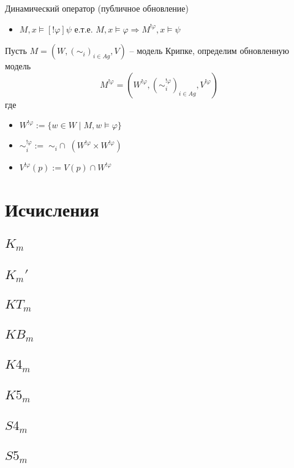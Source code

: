 \documentclass[11pt]{article}
\begin{document}
Динамический оператор (публичное обновление)
\begin{itemize}
\item $M, x \models [!\varphi]\psi$ е.т.е.
$M, x \models \varphi \Rightarrow M^{!\varphi}, x \models \psi$
\end{itemize}

Пусть $M= (W, (\sim_i)_{i \in Ag},  V)$ – модель Крипке, определим обновленную модель
$$M^{!\varphi}= (W^{!\varphi}, (\sim^{!\varphi}_i)_{i \in Ag},  V^{!\varphi})$$ 
где
\begin{itemize}
\item $W^{!\varphi}:= \{w \in W \mid M, w \models \varphi \}$
\item $\sim^{!\varphi}_i:=\; \sim_{i} \cap \; (W^{!\varphi} \times W^{!\varphi})  $
\item $V^{!\varphi}(p):= V(p) \cap W^{!\varphi}$	
\end{itemize}


\section{Исчисления}
\subsection{$K_m$}
\subsection{$K_m'$}
\subsection{$KT_m$}
\subsection{$KB_m$}
\subsection{$K4_m$}
\subsection{$K5_m$}

\subsection{$S4_m$}
\subsection{$S5_m$}
\end{document}
